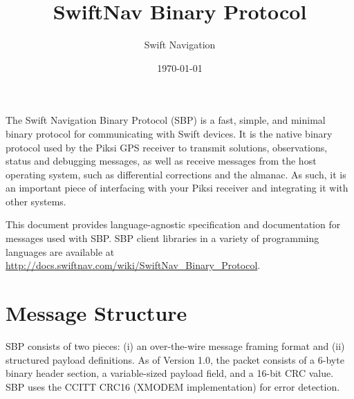 \documentclass{article}
\title{SwiftNav Binary Protocol}
\author{Swift Navigation}
\date{\today}
\makeatletter
\numberwithin{table}{subsection}
\numberwithin{field}{subsection}
\renewcommand\tableofcontents{\@starttoc{toc}}
\makeatother
\begin{document}
\maketitle
\begin{normalsize}
\setcounter{tocdepth}{2}
\begin{centering}
\tableofcontents
\end{centering}
\end{normalsize}

\thispagestyle{firstpage}
\bigskip
\bigskip
\begin{large}
The Swift Navigation Binary Protocol (SBP) is a fast, simple, and
minimal binary protocol for communicating with Swift devices. It is
the native binary protocol used by the Piksi GPS receiver to transmit
solutions, observations, status and debugging messages, as well as
receive messages from the host operating system, such as differential
corrections and the almanac. As such, it is an important piece of
interfacing with your Piksi receiver and integrating it with other
systems.

This document provides language-agnostic specification and
documentation for messages used with SBP. SBP client libraries in a
variety of programming languages are available at
\url{http://docs.swiftnav.com/wiki/SwiftNav_Binary_Protocol}.
\end{large}

\newpage
\section{Message Structure}
\label{sec:Message}

\begin{large}
SBP consists of two pieces: (i) an over-the-wire message framing
format and (ii) structured payload definitions. As of Version 1.0, the
packet consists of a 6-byte binary header section, a variable-sized
payload field, and a 16-bit CRC value. SBP uses the CCITT CRC16
(XMODEM implementation) for error detection.
\end{large}
\end{document}
